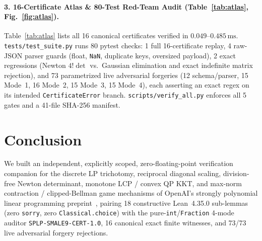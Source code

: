 \documentclass[10pt,twocolumn]{article}
\begin{document}
\paragraph{3. 16-Certificate Atlas \& 80-Test Red-Team Audit (Table~\ref{tab:atlas}, Fig.~\ref{fig:atlas}).}
Table~\ref{tab:atlas} lists all 16 canonical certificates verified in $0.049$--$0.485\,\mathrm{ms}$. \texttt{tests/test\_suite.py} runs 80 pytest checks: 1 full 16-certificate replay, 4 raw-JSON parser guards (float, \texttt{NaN}, duplicate keys, oversized payload), 2 exact regressions (Newton $4!\det$ vs.\ Gaussian elimination and exact indefinite matrix rejection), and 73 parametrized live adversarial forgeries (12 schema/parser, 15 Mode~1, 16 Mode~2, 15 Mode~3, 15 Mode~4), each asserting an exact regex on its intended \texttt{CertificateError} branch. \texttt{scripts/verify\_all.py} enforces all 5 gates and a 41-file SHA-256 manifest.

\section{Conclusion}\label{sec:conc}
We built an independent, explicitly scoped, zero-floating-point verification companion for the discrete LP trichotomy, reciprocal diagonal scaling, division-free Newton determinant, monotone LCP / convex QP KKT, and max-norm contraction / clipped-Bellman game mechanisms of OpenAI's strongly polynomial linear programming preprint~\cite{openai2026splp}, pairing 18 constructive Lean~4.35.0 sub-lemmas (zero \texttt{sorry}, zero \texttt{Classical.choice}) with the pure-\texttt{int}/\texttt{Fraction} 4-mode auditor \texttt{SPLP-SMALE9-CERT-1.0}, 16 canonical exact finite witnesses, and 73/73 live adversarial forgery rejections.

{\footnotesize\raggedright

}
\end{document}
